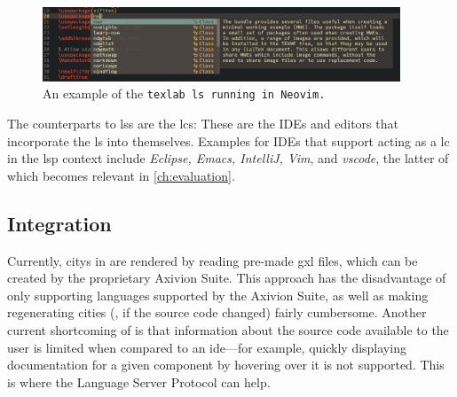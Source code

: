 \documentclass[../thesis]{subfiles}
\begin{document}
\begin{figure}
	\begin{center}
		\includegraphics[width=0.95\textwidth]{../figures/mwe}
	\end{center}
	\caption[An example of the \texttt{texlab} language server running in Neovim.]{An example of the \tt{texlab} \gls{ls} running in Neovim.}\label{fig:mwe}
\end{figure}

The counterparts to \glspl{ls} are the \glspl{lc}:
These are the IDEs and editors that incorporate the \gls{ls} into themselves.
Examples for IDEs that support acting as a \gls{lc} in the \gls{lsp} context include \emph{Eclipse, Emacs, IntelliJ, Vim}, and \emph{\gls{vscode}}, the latter of which becomes relevant in \cref{ch:evaluation}.

\subsection{Integration}\label{subsec:integration}
Currently, \glspl{city} in \SEE{} are rendered by reading pre-made \gls{gxl} files, which can be created by the proprietary Axivion Suite.
This approach has the disadvantage of only supporting languages supported by the Axivion Suite, as well as making regenerating cities (\eg, if the source code changed) fairly cumbersome.
Another current shortcoming of \SEE{} is that information about the source code available to the user is limited when compared to an \gls{ide}---for example, quickly displaying documentation for a given component by hovering over it is not supported.
This is where the Language Server Protocol can help.


%
\end{document}
